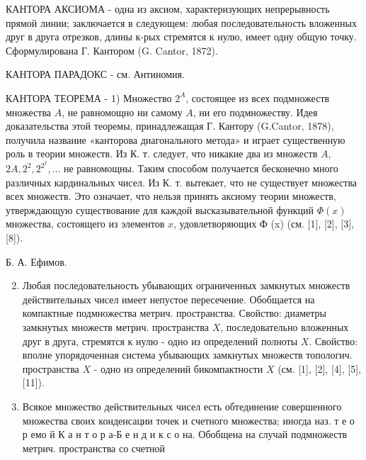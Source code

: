 \documentclass[10pt]{article}
\begin{document}
КАНТОРА АКСИОМА - одна из аксиом, характеризующих непрерывность прямой линии; заключается в следующем: любая последовательность вложенных друг в друга отрезков, длины к-рых стремятся к нулю, имеет одну общую точку. Сформулирована Г. Кантором (G. Cantor, 1872).



КАНТОРА ПАРАДОКС - см. Антиномия.



КАНТОРА ТЕОРЕМА - 1) Множество $2^{A}$, состоящее из всех подмножеств множества $A$, не равномощно ни самому $A$, ни его подмножеству. Идея доказательства этой теоремы, принадлежащая Г. Кантору (G.Cantor, 1878), получила название «канторова диагонального метода» и играет существенную роль в теории множеств. Из К. т. следует, что никакие два из множеств $A$, $2 A, 2^{2}, 2^{2^{2}}, \ldots$ не равномощны. Таким способом получается бесконечно много различных кардинальных чисел. Из К. т. вытекает, что не существует множества всех множеств. Это означает, что нельзя принять аксиому теории множеств, утверждающую существование для каждой высказывательной функций $\Phi(x)$ множества, состоящего из элементов $x$, удовлетворяющих Ф (x) (см. [1], [2], [3], [8]).



Б. А. Ефимов.



\begin{enumerate}

  \setcounter{enumi}{1}

  \item Любая последовательность убывающих ограниченных замкнутых множеств действительных чисел имеет непустое пересечение. Обобщается на компактные подмножества метрич. пространства. Свойство: диаметры замкнутых множеств метрич. пространства $X$, последовательно вложенных друг в друга, стремятся к нулю - одно из определений полноты $X$. Свойство: вполне упорядоченная система убывающих замкнутых множеств топологич. пространства $X$ - одно из определений бикомпактности $X$ (см. [1], [2], [4], [5], [11]).



  \item Всякое множество действительных чисел есть обтединение совершенного множества своих конденсации точек и счетного множества; иногда наз. т е о р емо й К а н т о р а-Б е н д и к с о на. Обобщена на случай подмножеств метрич. пространства со счетной



\end{enumerate}
\end{document}
